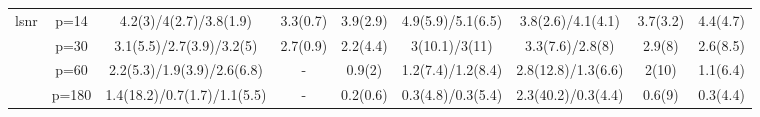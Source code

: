 \begin{table}[ht]
{\begin{tabular}{|c|c|ccccccc|}
  \midrule\multirow{4}[2]{*}{lsnr} & p=14 & 4.2(3)/4(2.7)/3.8(1.9) & 3.3(0.7) & 3.9(2.9) & 4.9(5.9)/5.1(6.5) & 3.8(2.6)/4.1(4.1) & 3.7(3.2) & 4.4(4.7) \\ 
   & p=30 & 3.1(5.5)/2.7(3.9)/3.2(5) & 2.7(0.9) & 2.2(4.4) & 3(10.1)/3(11) & 3.3(7.6)/2.8(8) & 2.9(8) & 2.6(8.5) \\ 
   & p=60 & 2.2(5.3)/1.9(3.9)/2.6(6.8) & - & 0.9(2) & 1.2(7.4)/1.2(8.4) & 2.8(12.8)/1.3(6.6) & 2(10) & 1.1(6.4) \\ 
   & p=180 & 1.4(18.2)/0.7(1.7)/1.1(5.5) & - & 0.2(0.6) & 0.3(4.8)/0.3(5.4) & 2.3(40.2)/0.3(4.4) & 0.6(9) & 0.3(4.4) \\ 
   \bottomrule 
\end{tabular}
}
\end{table}

